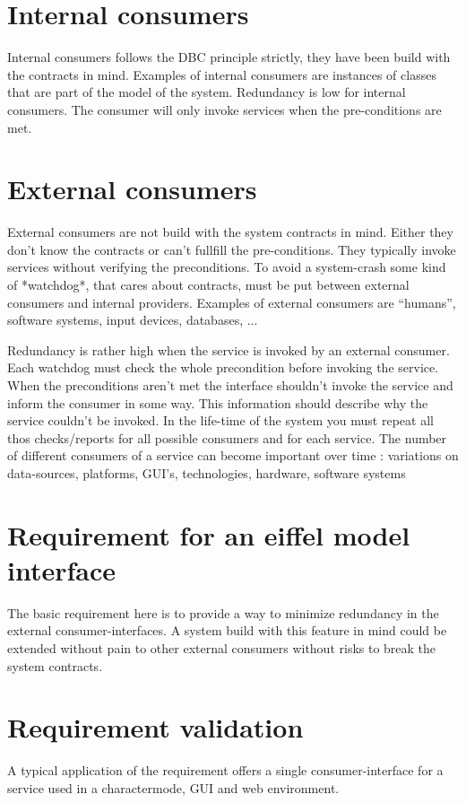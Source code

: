 \documentclass{article}
\begin{document}
\section {Internal consumers}
Internal consumers follows the DBC principle strictly,  they have been build with the contracts in mind. Examples of internal consumers are instances of classes that are part of the model of the system.
Redundancy is low for internal consumers. The consumer will only invoke services when the pre-conditions are  met.
\section {External consumers}
External consumers are not build with the system contracts in mind. Either they don't know the contracts or can't fullfill the pre-conditions. They typically invoke services without verifying the preconditions. To avoid a system-crash some kind of *watchdog*, that cares about contracts, must be put between external consumers and internal providers. Examples of external consumers are ``humans'', software systems, input devices, databases, ...

Redundancy is rather high when the service is invoked by an external consumer. Each watchdog must check the whole precondition before invoking the service. When the preconditions aren't met the interface shouldn't invoke the service and inform the consumer in some way. This information should describe why the service couldn't be invoked. In the life-time of the system you must repeat  all thos checks/reports for all possible consumers and for each service. The number of different consumers of a service can become important over time :  variations on data-sources, platforms, GUI's, technologies, hardware, software systems

\section {Requirement for an eiffel model interface}

The basic requirement here is to provide a way to minimize redundancy in the external consumer-interfaces. A system build with this feature in mind could be extended without pain to other external consumers without risks to break the system contracts.
\section {Requirement validation}
A typical application of the requirement offers a single consumer-interface for a service used in a charactermode, GUI and web environment.  
    
\end{document}
